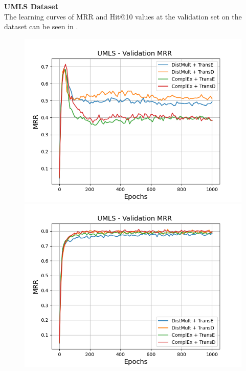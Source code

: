 \textbf{UMLS Dataset}
\label{subsubsec:methods_umls}\\
%
The learning curves of MRR and Hit@10 values at the validation set on the \umls dataset can be seen in .
\begin{figure}[H]
    \centering
    \begin{minipage}{.5\textwidth}
      \centering
      \includegraphics[width=0.9\linewidth]{figures/results/gan_train/not_pretrained/uncertainty/max/entropy/umls/1k_epochs/uncertainty_umls_mrrs.png}
    \end{minipage}%
    \begin{minipage}{.5\textwidth}
      \centering
      \includegraphics[width=0.9\linewidth]{figures/results/gan_train/not_pretrained/uncertainty/max_distribution/entropy/umls/1k_epochs/uncertainty_umls_mrrs.png}
    \end{minipage}

\end{figure}
